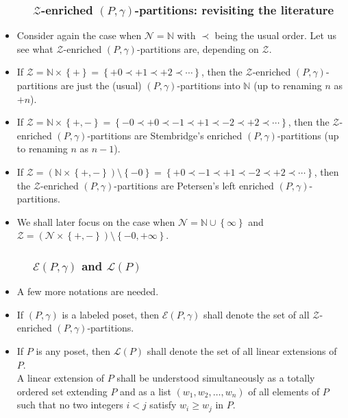 \documentclass{beamer}
\newcommand{\blue}{\color{blue}}
\newcommand{\NN}{{\mathbb N}}
\newcommand{\calE}{\mathcal{E}}
\newcommand{\calL}{\mathcal{L}}
\newcommand{\calN}{\mathcal{N}}
\newcommand{\calZ}{\mathcal{Z}}
\newcommand{\fti}[1]{\frametitle{\ \ \ \ \ #1}}
\newcommand{\set}[1]{\left\{ #1 \right\}}
\newcommand{\tup}[1]{\left( #1 \right)}
\newcommand{\defn}[1]{{\color{darkred}\emph{#1}}} %
\theoremstyle{plain}
\begin{document}
\begin{frame}
\fti{$\calZ$-enriched $\tup{P,\gamma}$-partitions: revisiting the literature}

\begin{itemize}

\item Consider again the case when $\calN = \NN$ with $\prec$ being the usual order.
Let us see what $\calZ$-enriched $\tup{P,\gamma}$-partitions are,
depending on $\calZ$.

\pause

\item If $\calZ = \NN \times \set{+} = \set{+0 \prec +1 \prec +2 \prec \cdots}$,
then the $\calZ$-enriched $\tup{P,\gamma}$-partitions are just
the {\blue (usual) $\tup{P,\gamma}$-partitions} into $\NN$ (up to renaming
$n$ as $+n$).

\pause
\item If $\calZ = \NN \times \set{+,-}
= \set{-0 \prec +0 \prec -1 \prec +1 \prec -2 \prec +2 \prec \cdots}$, then the
$\calZ$-enriched $\tup{P,\gamma}$-partitions are
{\blue Stembridge's enriched $\tup{P,\gamma}$-partitions} (up to renaming
$n$ as $n-1$).

\pause
\item If $\calZ = \tup{\NN \times \set{+,-}} \setminus \set{-0}
= \set{+0 \prec -1 \prec +1 \prec -2 \prec +2 \prec \cdots}$, then the
$\calZ$-enriched $\tup{P,\gamma}$-partitions are
{\blue Petersen's left enriched $\tup{P,\gamma}$-partitions}.

\pause

\item We shall later focus on the case when
$\calN = \NN \cup \set{\infty}$ and
$\calZ = \tup{\calN \times \set{+,-}} \setminus \set{-0, +\infty}$.

\end{itemize}

\end{frame}

\begin{frame}
\fti{$\calE\tup{P,\gamma}$ and $\calL\tup{P}$}

\begin{itemize}

\item A few more notations are needed.

\item If $\left(  P,\gamma\right)  $ is a labeled poset, then
\defn{$\calE\tup{P,\gamma}$}
shall denote the set of all $\mathcal{Z}$-enriched $\left(
P,\gamma\right)  $-partitions.

\pause

\item If $P$ is any poset, then \defn{$\calL\tup{P}$} shall denote the set
of all linear extensions of $P$. \\
A linear extension of $P$ shall be understood
simultaneously as a totally ordered set extending $P$ and as a list $\left(
w_{1},w_{2},\ldots,w_{n}\right)  $ of all elements of $P$ such that no two
integers $i<j$ satisfy $w_{i}\geq w_{j}$ in $P$.

\end{itemize}

\end{frame}
\end{document}
